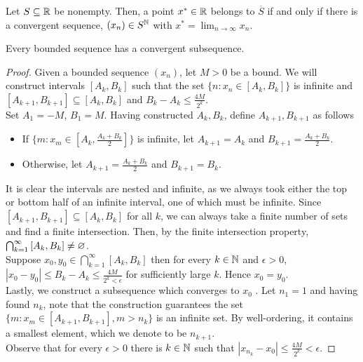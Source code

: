 \begin{proposition}
	Let \(S \subseteq \mathbb{R}\) be nonempty. Then, a point \(x^{*} \in \mathbb{R}\) belongs to \(\overline{S}\) if and only if there is a convergent sequence, \(\left( x_{n} \right) \in S^{\mathbb{N}}\) with \(x^{*} = \lim_{n \to \infty}x_{n}\).
\end{proposition}
\begin{theorem}
Every bounded sequence has a convergent subsequence.
\end{theorem}
\begin{proof}
	Given a bounded sequence \(\left( x_{n} \right) \), let \(M > 0\) be a bound. We will construct intervals \(\left[ A_{k}, B_{k} \right] \) such that the set \(\{ n : x_{n} \in \left[ A_{k}, B_{k} \right] \} \) is infinite and \(\left[ A_{k+1}, B_{k+1} \right] \subseteq \left[ A_{k}, B_{k} \right]  \) and \(B_{k} - A_{k} \le \frac{4M}{2^{k}}\).\\
	Set \(A_1 = -M\), \(B_1 = M\). Having constructed \(A_{k}, B_{k}\), define \(A_{k+1}, B_{k+1}\) as follows
	\begin{itemize}
		\item If \(\{m : x_{m} \in \left[ A_{k}, \frac{A_{k} + B_{k}}{2} \right] \} \) is infinite, let \(A_{k+1} = A_{k}\) and \(B_{k+1} = \frac{A_{k} + B_{k}}{2}\).
			\item Otherwise, let \(A_{k+1} = \frac{A_{k} + B_{k}}{2} \) and \(B_{k+1} = B_{k}\).
	\end{itemize}
	It is clear the intervals are nested and infinite, as we always took either the top or bottom half of an infinite interval, one of which must be infinite. Since \(\left[ A_{k+1}, B_{k+1} \right] \subseteq \left[ A_{k}, B_{k} \right] \) for all \(k\), we can always take a finite number of sets and find a finite intersection. Then, by the finite intersection property, \(\bigcap_{k=1} ^{ \infty} \left[ A_{k}, B_{k} \right]  \neq \varnothing\).\\
	Suppose \(x_0, y_0 \in \bigcap_{k=1} ^{\infty}\left[ A_{k}, B_{k} \right] \) then for every \(k \in \mathbb{N}\) and \(\epsilon > 0\), \(\left| x_0 - y_0 \right|  \le B_{k} - A_{k} \le \frac{4M}{2^{k} < \epsilon}\) for sufficiently large \(k\). Hence \(x_0 = y_0\).\\
	Lastly, we construct a subsequence which converges to \(x_0\) . Let \(n_1 = 1\) and having found \(n_{k}\), note that the construction guarantees the set \(\{m : x_{m} \in \left[ A_{k+1}, B_{k+1} \right], m > n_{k} \}\) is an infinite set. By well-ordering, it contains a smallest element, which we denote to be \(n_{k+1}\).\\
	Observe that for every \(\epsilon > 0\) there is \(k \in \mathbb{N}\) such that \(\left| x_{n_{k}} - x_0 \right| \le \frac{4M}{2^{k}} < \epsilon\).
\end{proof}
